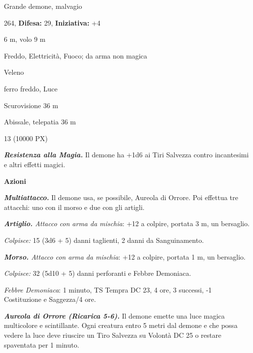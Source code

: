 \begin{multicols}{2}
{
\noindent
\begin{description}[noitemsep, topsep=0pt, parsep=0pt, partopsep=0pt, leftmargin=0cm, labelwidth=2.2cm]
	\item[\textbf{Taglia/Tipo:}] Grande demone, malvagio
	\item[\textbf{Caratt.:}] 
	\item[\textbf{Punti Ferita:}] 264,  \textbf{Difesa:} 29,  \textbf{Iniziativa:} +4
	\item[\textbf{Movimento:}] 6 m, volo 9 m
	\item[\textbf{Tiri Salvez.:}] 
	\item[\textbf{Res. Danni:}] Freddo, Elettricità, Fuoco; da arma non magica
	\item[\textbf{Imm. Danni:}] Veleno
	\item[\textbf{Vulnerabilità:}] ferro freddo, Luce
	\item[\textbf{Sensi:}] Scurovisione 36 m
	\item[\textbf{Linguaggi:}] Abissale, telepatia 36 m
	\item[\textbf{Sfida:}] 13 (10000 PX)\smallskip
\end{description}

\emph{\textbf{Resistenza alla Magia.}} Il demone ha +1d6 ai Tiri Salvezza contro incantesimi e altri effetti magici.

\textbf{Azioni}

\emph{\textbf{Multiattacco.}} Il demone usa, se possibile, Aureola di Orrore. Poi effettua tre attacchi: uno con il morso e due con gli artigli.

\emph{\textbf{Artiglio.} Attacco con arma da mischia}: +12 a colpire, portata 3 m, un bersaglio.

\emph{Colpisce:} 15 (3d6 + 5) danni taglienti, 2 danni da Sanguinamento.

\emph{\textbf{Morso.} Attacco con arma da mischia}: +12 a colpire, portata 1 m, un bersaglio.

\emph{Colpisce:} 32 (5d10 + 5) danni perforanti e Febbre Demoniaca.

\emph{Febbre Demoniaca}: 1 minuto, TS Tempra DC 23, 4 ore, 3 successi, -1 Costituzione e Saggezza/4 ore.

\emph{\textbf{Aureola di Orrore (Ricarica 5-6).}} Il demone emette una luce magica multicolore e scintillante. Ogni creatura entro 5 metri dal demone e che possa vedere la luce deve riuscire un Tiro Salvezza su Volontà DC 25 o restare spaventata per 1 minuto.

}
\end{multicols}
